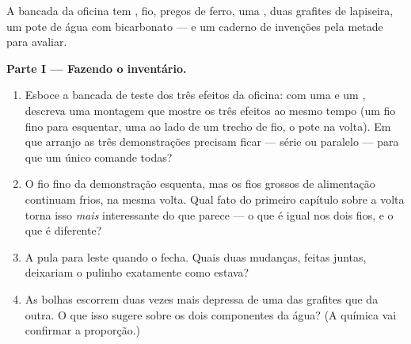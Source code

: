 \begin{problem}\label{pb:g8:electric-current-effects:1}
A bancada da oficina tem , fio, pregos de ferro, uma ,
duas grafites de lapiseira, um pote de água com bicarbonato --- e um
caderno de invenções pela metade para avaliar.

\medskip\noindent\textbf{Parte I --- Fazendo o inventário.}
\begin{enumerate}
  \item Esboce a bancada de teste dos três efeitos da oficina: com
        uma  e um , descreva uma montagem que mostre
        os três efeitos ao mesmo tempo (um fio fino para esquentar,
        uma  ao lado de um trecho de fio, o pote na volta). Em
        que arranjo as três demonstrações precisam ficar --- série ou
        paralelo --- para que um único  comande todas?
  \item O fio fino da demonstração esquenta, mas os fios grossos de
        alimentação continuam frios, na mesma volta. Qual fato do
        primeiro capítulo sobre a volta  torna isso
        \emph{mais} interessante do que parece --- o que é igual nos
        dois fios, e o que é diferente?
  \item A  pula para leste quando o  fecha. Quais
        duas mudanças, feitas juntas, deixariam o pulinho exatamente
        como estava?
  \item As bolhas escorrem duas vezes mais depressa de uma das
        grafites que da outra. O que isso sugere sobre os dois
        componentes da água? (A química vai confirmar a proporção.)
\end{enumerate}


\end{problem}
